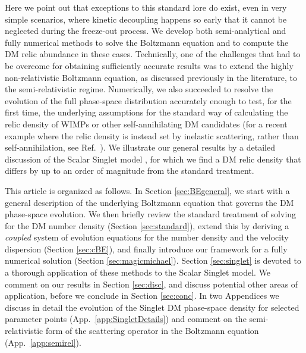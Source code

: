 \documentclass[twocolumn,showpacs,amsmath,amssymb,superscriptaddress,nofootinbib]{revtex4-1}
\begin{document}
\smallskip

Here we point out that exceptions to this standard lore do exist, even in very simple 
scenarios, where kinetic decoupling happens so early that it cannot be neglected 
during the freeze-out process. We develop both semi-analytical and fully numerical 
methods to solve the Boltzmann equation and to compute the DM relic abundance in 
these cases. Technically, one of the challenges that had to be overcome for obtaining
sufficiently accurate results  was to extend the highly non-relativistic Boltzmann equation, 
as discussed previously in the literature, to the semi-relativistic regime.
Numerically, we also succeeded to resolve the evolution of the full phase-space distribution
accurately enough to test, for the first time, the underlying assumptions for the standard
way of calculating the relic density of WIMPs or other self-annihilating DM candidates
(for a recent example where the relic density is instead set by inelastic scattering, rather than
self-annihilation, see Ref.~\cite{DAgnolo:2017dbv}). 
We illustrate our general results by a detailed discussion of the 
Scalar Singlet model \cite{Silveira:1985rk,McDonald:1993ex,Burgess:2000yq}, for which 
we find a DM relic density that differs by up to an order of magnitude from the standard 
treatment.

\smallskip

This article is organized as follows. In Section  \ref{sec:BEgeneral},
we start with a general description of the underlying Boltzmann equation that governs 
the DM phase-space evolution. We then briefly review the standard treatment of 
solving for the DM number density
(Section \ref{sec:standard}), extend this by deriving a {\it coupled} system of evolution 
equations for the number density and the velocity dispersion (Section \ref{sec:cBE}),
and finally introduce our framework for a fully numerical solution (Section \ref{sec:magicmichael}).
Section \ref{sec:singlet} is devoted to a thorough application of these methods to the Scalar Singlet
model. 
We comment on our results in Section \ref{sec:disc},
and discuss potential other areas of application, before we conclude in Section \ref{sec:conc}.
In two  Appendices we discuss in 
detail the evolution of the Singlet DM phase-space 
density for selected parameter points (App.~\ref{app:SingletDetails}) and comment on the semi-relativistic 
form of the scattering operator in the Boltzmann equation (App.~\ref{app:semirel}).

\end{document}

